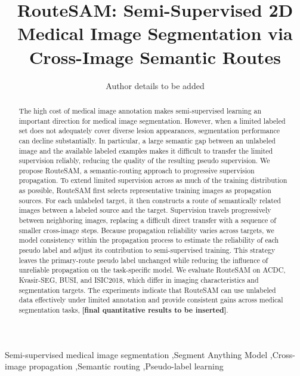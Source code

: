 \documentclass[a4paper,fleqn]{cas-dc}
\begin{document}
\let\WriteBookmarks\relax
\def\floatpagepagefraction{1}
\def\textpagefraction{.001}

\title[mode=title]{RouteSAM: Semi-Supervised 2D Medical Image Segmentation via Cross-Image Semantic Routes}
\author[1]{Author details to be added}

\begin{abstract}
The high cost of medical image annotation makes semi-supervised learning an important direction for medical image segmentation. However, when a limited labeled set does not adequately cover diverse lesion appearances, segmentation performance can decline substantially. In particular, a large semantic gap between an unlabeled image and the available labeled examples makes it difficult to transfer the limited supervision reliably, reducing the quality of the resulting pseudo supervision.
We propose RouteSAM, a semantic-routing approach to progressive supervision propagation. To extend limited supervision across as much of the training distribution as possible, RouteSAM first selects representative training images as propagation sources. For each unlabeled target, it then constructs a route of semantically related images between a labeled source and the target. Supervision travels progressively between neighboring images, replacing a difficult direct transfer with a sequence of smaller cross-image steps.
Because propagation reliability varies across targets, we model consistency within the propagation process to estimate the reliability of each pseudo label and adjust its contribution to semi-supervised training. This strategy leaves the primary-route pseudo label unchanged while reducing the influence of unreliable propagation on the task-specific model.
We evaluate RouteSAM on ACDC, Kvasir-SEG, BUSI, and ISIC2018, which differ in imaging characteristics and segmentation targets. The experiments indicate that RouteSAM can use unlabeled data effectively under limited annotation and provide consistent gains across medical segmentation tasks, \textbf{[final quantitative results to be inserted]}.
\end{abstract}

\begin{keywords}
Semi-supervised medical image segmentation \sep Segment Anything Model \sep Cross-image propagation \sep Semantic routing \sep Pseudo-label learning
\end{keywords}
\maketitle
\end{document}
